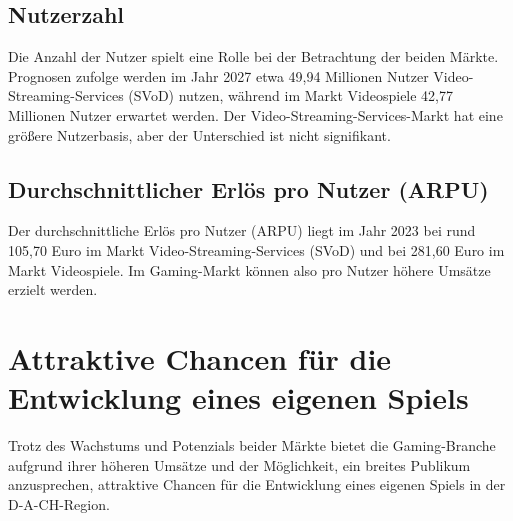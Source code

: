 \subsection{Nutzerzahl}

Die Anzahl der Nutzer spielt eine Rolle bei der Betrachtung der beiden Märkte. Prognosen zufolge werden im Jahr 2027 etwa 49,94 Millionen Nutzer Video-Streaming-Services (SVoD) nutzen, während im Markt Videospiele 42,77 Millionen Nutzer erwartet werden. Der Video-Streaming-Services-Markt hat eine größere Nutzerbasis, aber der Unterschied ist nicht signifikant.

\subsection{Durchschnittlicher Erlös pro Nutzer (ARPU)}

Der durchschnittliche Erlös pro Nutzer (ARPU) liegt im Jahr 2023 bei rund 105,70 Euro im Markt Video-Streaming-Services (SVoD) und bei 281,60 Euro im Markt Videospiele. Im Gaming-Markt können also pro Nutzer höhere Umsätze erzielt werden.

\section{Attraktive Chancen für die Entwicklung eines eigenen Spiels}

Trotz des Wachstums und Potenzials beider Märkte bietet die Gaming-Branche aufgrund ihrer höheren Umsätze und der Möglichkeit, ein breites Publikum anzusprechen, attraktive Chancen für die Entwicklung eines eigenen Spiels in der D-A-CH-Region.